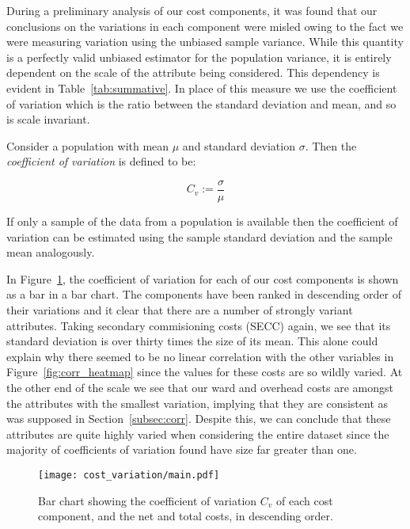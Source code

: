 During a preliminary analysis of our cost components, it was found that our
conclusions on the variations in each component were misled owing to the fact we
were measuring variation using the unbiased sample variance. While this quantity
is a perfectly valid unbiased estimator for the population variance, it is
entirely dependent on the scale of the attribute being considered. This
dependency is evident in Table~\ref{tab:summative}. In place of this measure we
use the coefficient of variation which is the ratio between the standard
deviation and mean, and so is scale invariant.

\begin{definition}
    Consider a population with mean \(\mu\) and standard deviation \(\sigma\).
    Then the \emph{coefficient of variation} is defined to be:

    \[
        C_{v} := \frac{\sigma}{\mu}
    \]

    If only a sample of the data from a population is available then the
    coefficient of variation can be estimated using the sample standard
    deviation and the sample mean analogously.
\end{definition}

In Figure~\ref{fig:cost_variation}, the coefficient of variation for each of our
cost components is shown as a bar in a bar chart. The components have been
ranked in descending order of their variations and it clear that there are a
number of strongly variant attributes. Taking secondary commisioning costs
(SECC) again, we see that its standard deviation is over thirty times the size
of its mean. This alone could explain why there seemed to be no linear
correlation with the other variables in Figure~\ref{fig:corr_heatmap} since the
values for these costs are so wildly varied. At the other end of the scale we
see that our ward and overhead costs are amongst the attributes with the
smallest variation, implying that they are consistent as was supposed in
Section~\ref{subsec:corr}. Despite this, we can conclude that these attributes
are quite highly varied when considering the entire dataset since the majority
of coefficients of variation found have size far greater than one.

\begin{figure}[h]
    \centering
    \texttt{[image: cost\_variation/main.pdf]}
    \caption{Bar chart showing the coefficient of variation \(C_{v}\) of each
    cost component, and the net and total costs, in descending
    order.}\label{fig:cost_variation}
\end{figure}

